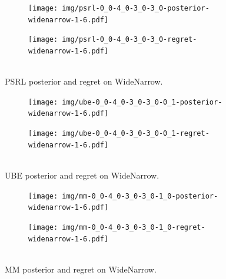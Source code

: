 \documentclass{article}
\begin{document}
\begin{appendices}
\begin{figure}[h!]
\centering
\begin{subfigure}{0.65\textwidth}
\texttt{[image: img/psrl-0\_0-4\_0-3\_0-3\_0-posterior-widenarrow-1-6.pdf]}
\end{subfigure}
\begin{subfigure}{0.34\textwidth}
\texttt{[image: img/psrl-0\_0-4\_0-3\_0-3\_0-regret-widenarrow-1-6.pdf]}~\\~\\
\end{subfigure}
\captionsetup{width=0.9\linewidth}
\caption{PSRL posterior and regret on WideNarrow.}\label{psrl_widenarrow_visual}
\end{figure}

\begin{figure}[h!]
\centering
\vspace{-1cm}
\begin{subfigure}{0.65\textwidth}
\texttt{[image: img/ube-0\_0-4\_0-3\_0-3\_0-0\_1-posterior-widenarrow-1-6.pdf]}
\end{subfigure}
\begin{subfigure}{0.34\textwidth}
\texttt{[image: img/ube-0\_0-4\_0-3\_0-3\_0-0\_1-regret-widenarrow-1-6.pdf]}~\\~\\
\end{subfigure}
\captionsetup{width=0.9\linewidth}
\caption{UBE posterior and regret on WideNarrow.}\label{ube_widenarrow_visual01}
\end{figure}

\begin{figure}[h!]
\centering
\begin{subfigure}{0.65\textwidth}
\texttt{[image: img/mm-0\_0-4\_0-3\_0-3\_0-1\_0-posterior-widenarrow-1-6.pdf]}
\end{subfigure}
\begin{subfigure}{0.34\textwidth}
\texttt{[image: img/mm-0\_0-4\_0-3\_0-3\_0-1\_0-regret-widenarrow-1-6.pdf]}~\\~\\
\end{subfigure}
\captionsetup{width=0.9\linewidth}
\caption{MM posterior and regret on WideNarrow.}\label{mm_widenarrow_visual}
\end{figure}


\end{appendices}
\end{document}
